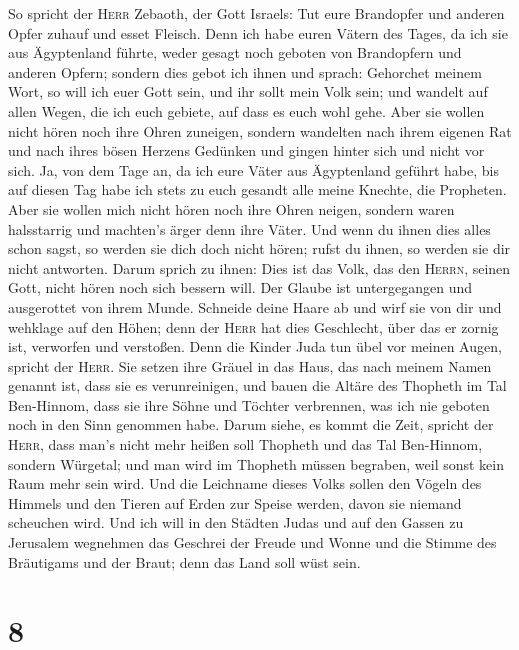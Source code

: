  So spricht der \textsc{Herr} Zebaoth, der Gott Israels:
Tut eure Brandopfer und anderen Opfer zuhauf und esset Fleisch.
 Denn ich habe euren Vätern des Tages, da ich sie aus
Ägyptenland führte, weder gesagt noch geboten von Brandopfern und
anderen Opfern;  sondern dies gebot ich ihnen und sprach:
Gehorchet meinem Wort, so will ich euer Gott sein, und ihr sollt mein
Volk sein; und wandelt auf allen Wegen, die ich euch gebiete, auf dass
es euch wohl gehe.  Aber sie wollen nicht hören noch ihre
Ohren zuneigen, sondern wandelten nach ihrem eigenen Rat und nach ihres
bösen Herzens Gedünken und gingen hinter sich und nicht vor sich.
 Ja, von dem Tage an, da ich eure Väter aus Ägyptenland
geführt habe, bis auf diesen Tag habe ich stets zu euch gesandt alle
meine Knechte, die Propheten.  Aber sie wollen mich nicht
hören noch ihre Ohren neigen, sondern waren halsstarrig und machten's
ärger denn ihre Väter.  Und wenn du ihnen dies alles
schon sagst, so werden sie dich doch nicht hören; rufst du ihnen, so
werden sie dir nicht antworten.  Darum sprich zu ihnen:
Dies ist das Volk, das den \textsc{Herrn}, seinen Gott, nicht hören noch
sich bessern will. Der Glaube ist untergegangen und ausgerottet von
ihrem Munde.  Schneide deine Haare ab und wirf sie von
dir und wehklage auf den Höhen; denn der \textsc{Herr} hat dies
Geschlecht, über das er zornig ist, verworfen und verstoßen.
 Denn die Kinder Juda tun übel vor meinen Augen, spricht
der \textsc{Herr}. Sie setzen ihre Gräuel in das Haus, das nach meinem
Namen genannt ist, dass sie es verunreinigen,  und bauen
die Altäre des Thopheth im Tal Ben-Hinnom, dass sie ihre Söhne und
Töchter verbrennen, was ich nie geboten noch in den Sinn genommen habe.
 Darum siehe, es kommt die Zeit, spricht der
\textsc{Herr}, dass man's nicht mehr heißen soll Thopheth und das Tal
Ben-Hinnom, sondern Würgetal; und man wird im Thopheth müssen begraben,
weil sonst kein Raum mehr sein wird.  Und die Leichname
dieses Volks sollen den Vögeln des Himmels und den Tieren auf Erden zur
Speise werden, davon sie niemand scheuchen wird.  Und ich
will in den Städten Judas und auf den Gassen zu Jerusalem wegnehmen das
Geschrei der Freude und Wonne und die Stimme des Bräutigams und der
Braut; denn das Land soll wüst sein.

\hypertarget{section-7}{%
\section{8}\label{section-7}}

